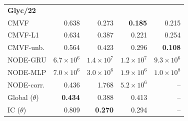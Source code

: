 \begin{tabular*}{\linewidth}{@{\extracolsep{\fill}}lrrrr}
\midrule
\multicolumn{5}{l}{\textbf{Glyc/22}} \\
CMVF & 0.638 & 0.273 & \textbf{0.185} & 0.215 \\
CMVF-L1 & 0.634 & 0.387 & 0.221 & 0.254 \\
CMVF-unb. & 0.564 & 0.423 & 0.296 & \textbf{0.108} \\
NODE-GRU & $6.7\!\times\!10^{6}$ & $1.4\!\times\!10^{7}$ & $1.2\!\times\!10^{7}$ & $9.3\!\times\!10^{6}$ \\
NODE-MLP & $7.0\!\times\!10^{6}$ & $3.0\!\times\!10^{6}$ & $1.9\!\times\!10^{6}$ & $1.0\!\times\!10^{8}$ \\
NODE-corr. & 0.436 & 1.768 & $5.2\!\times\!10^{6}$ & -- \\
Global ($\theta$) & \textbf{0.434} & 0.388 & 0.413 & -- \\
IC ($\theta$) & 0.809 & \textbf{0.270} & 0.294 & -- \\
\bottomrule
\end{tabular*}
